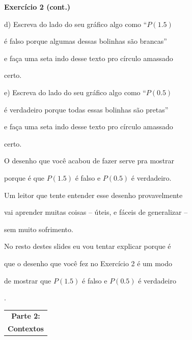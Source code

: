 \documentclass[oneside,12pt]{article}
\begin{document}
\newpage

{\bf Exercício 2 (cont.)}

\msk

d) Escreva do lado do seu gráfico algo como ``$P(1.5)$

é falso porque algumas dessas bolinhas são brancas''

e faça uma seta indo desse texto pro círculo amassado

certo.

\msk

e) Escreva do lado do seu gráfico algo como ``$P(0.5)$

é verdadeiro porque todas essas bolinhas são pretas''

e faça uma seta indo desse texto pro círculo amassado

certo.

\bsk

O desenho que você acabou de fazer serve pra mostrar

porque é que $P(1.5)$ é falso e $P(0.5)$ é verdadeiro.

Um leitor que tente entender esse desenho provavelmente

vai aprender muitas coisas -- úteis, e fáceis de generalizar --

sem muito sofrimento.


\newpage

No resto destes slides eu vou tentar explicar porque é

que o desenho que você fez no Exercício 2 é um modo

de mostrar que $P(1.5)$ é falso e $P(0.5)$ é verdadeiro

.



\newpage

\thispagestyle{empty}

\begin{center}

\vspace*{1.2cm}

\begin{tabular}{c}
{\bf \large Parte 2:} \\
{\bf \Large Contextos} \\
\end{tabular}

\end{center}
\end{document}
